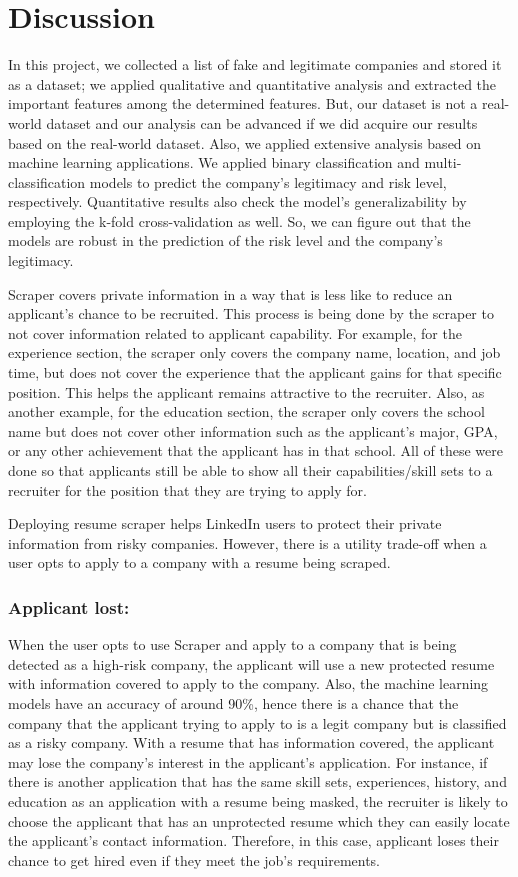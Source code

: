 \documentclass{article}
\begin{document}
\section{Discussion}

In this project, we collected a list of fake and legitimate companies and stored it as a dataset; we applied qualitative and quantitative analysis and extracted the important features among the determined features. But, our dataset is not a real-world dataset and our analysis can be advanced if we did acquire our results based on the real-world dataset. Also, we applied extensive analysis based on machine learning applications. We applied binary classification and multi-classification models to predict the company's legitimacy and risk level, respectively. Quantitative results also check the model's generalizability by employing the k-fold cross-validation as well. So, we can figure out that the models are robust in the prediction of the risk level and the company's legitimacy.

Scraper covers private information in a way that is less like to reduce an applicant's chance to be recruited. This process is being done by the scraper to not cover information related to applicant capability. For example, for the experience section, the scraper only covers the company name, location, and job time, but does not cover the experience that the applicant gains for that specific position. This helps the applicant remains attractive to the recruiter. Also, as another example, for the education section, the scraper only covers the school name but does not cover other information such as the applicant’s major, GPA, or any other achievement that the applicant has in that school. All of these were done so that applicants still be able to show all their capabilities/skill sets to a recruiter for the position that they are trying to apply for.

Deploying resume scraper helps LinkedIn users to protect their private information from risky companies. However, there is a utility trade-off when a user opts to apply to a company with a resume being scraped. 
\subsubsection{Applicant lost: }
When the user opts to use Scraper and apply to a company that is being detected as a high-risk company, the applicant will use a new protected resume with information covered to apply to the company. Also, the machine learning models have an accuracy of around 90\%, hence there is a chance that the company that the applicant trying to apply to is a legit company but is classified as a risky company. With a resume that has information covered, the applicant may lose the company’s interest in the applicant’s application. For instance, if there is another application that has the same skill sets, experiences, history, and education as an application with a resume being masked, the recruiter is likely to choose the applicant that has an unprotected resume which they can easily locate the applicant's contact information. Therefore, in this case, applicant loses their chance to get hired even if they meet the job’s requirements.
\end{document}

